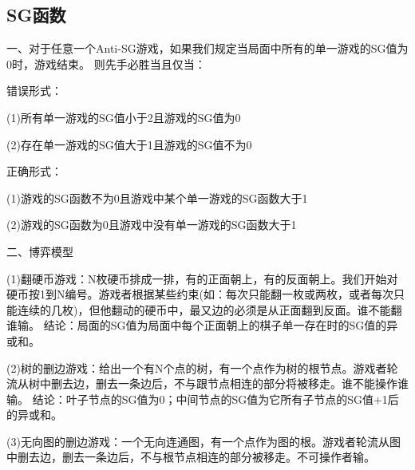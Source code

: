 \subsection{SG函数}
一、对于任意一个Anti-SG游戏，如果我们规定当局面中所有的单一游戏的SG值为0时，游戏结束。
则先手必胜当且仅当：\par

错误形式： \par

(1)所有单一游戏的SG值小于2且游戏的SG值为0 \par

(2)存在单一游戏的SG值大于1且游戏的SG值不为0 \par

正确形式： \par

(1)游戏的SG函数不为0且游戏中某个单一游戏的SG函数大于1 \par

(2)游戏的SG函数为0且游戏中没有单一游戏的SG函数大于1 \par


二、博弈模型 \par

(1)翻硬币游戏：N枚硬币排成一排，有的正面朝上，有的反面朝上。我们开始对硬币按1到N编号。游戏者根据某些约束(如：每次只能翻一枚或两枚，或者每次只能连续的几枚)，但他翻动的硬币中，最又边的必须是从正面翻到反面。谁不能翻谁输。
结论：局面的SG值为局面中每个正面朝上的棋子单一存在时的SG值的异或和。\par

(2)树的删边游戏：给出一个有N个点的树，有一个点作为树的根节点。游戏者轮流从树中删去边，删去一条边后，不与跟节点相连的部分将被移走。谁不能操作谁输。
结论：叶子节点的SG值为0；中间节点的SG值为它所有子节点的SG值+1后的异或和。\par

(3)无向图的删边游戏：一个无向连通图，有一个点作为图的根。游戏者轮流从图中删去边，删去一条边后，不与根节点相连的部分被移走。不可操作者输。

